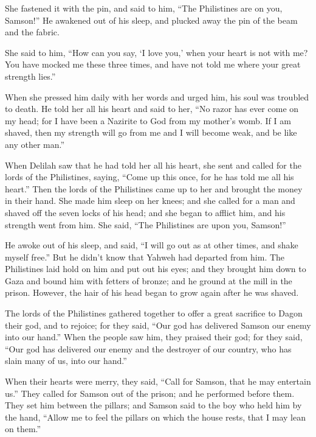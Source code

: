 {\par }{\PP {}She fastened it with the pin, and said to him, “The Philistines are on you, Samson!” He awakened out of his sleep, and plucked away the pin of the beam and the fabric.
\par }{\PP {}She said to him, “How can you say, ‘I love you,’ when your heart is not with me? You have mocked me these three times, and have not told me where your great strength lies.”
\par }{\PP {}When she pressed him daily with her words and urged him, his soul was troubled to death.
He told her all his heart and said to her, “No razor has ever come on my head; for I have been a Nazirite to God from my mother’s womb. If I am shaved, then my strength will go from me and I will become weak, and be like any other man.”
\par }{\PP {}When Delilah saw that he had told her all his heart, she sent and called for the lords of the Philistines, saying, “Come up this once, for he has told me all his heart.” Then the lords of the Philistines came up to her and brought the money in their hand.
She made him sleep on her knees; and she called for a man and shaved off the seven locks of his head; and she began to afflict him, and his strength went from him.
She said, “The Philistines are upon you, Samson!”
\par }{\PP He awoke out of his sleep, and said, “I will go out as at other times, and shake myself free.” But he didn’t know that Yahweh had departed from him.
The Philistines laid hold on him and put out his eyes; and they brought him down to Gaza and bound him with fetters of bronze; and he ground at the mill in the prison.
However, the hair of his head began to grow again after he was shaved.
\par }{\PP {}The lords of the Philistines gathered together to offer a great sacrifice to Dagon their god, and to rejoice; for they said, “Our god has delivered Samson our enemy into our hand.”
When the people saw him, they praised their god; for they said, “Our god has delivered our enemy and the destroyer of our country, who has slain many of us, into our hand.”
\par }{\PP {}When their hearts were merry, they said, “Call for Samson, that he may entertain us.” They called for Samson out of the prison; and he performed before them. They set him between the pillars;
and Samson said to the boy who held him by the hand, “Allow me to feel the pillars on which the house rests, that I may lean on them.”
}
